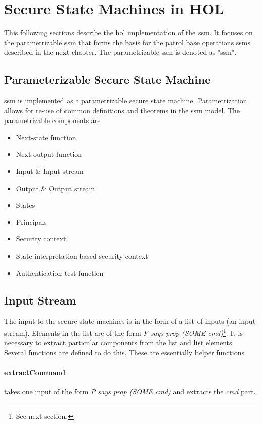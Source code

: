 \documentclass[../../main/main.tex]{subfiles}
\begin{document}
\section{Secure State Machines in HOL}\label{sec:sminHOL}
This following sections describe the \gls{hol} implementation of the \gls{ssm}.  It focuses on the parametrizable \gls{ssm} that forms the basis for the patrol base operations \glspl{ssm} described in the next chapter.  The parametrizable \gls{ssm} is denoted as "ssm".

\subsection{Parameterizable Secure State Machine}
ssm is implemented as a parametrizable secure state machine. Parametrization allows for re-use of common definitions and theorems in the \gls{ssm} model.  The parametrizable components are
\begin{itemize}
\item Next-state function
\item Next-output function
\item Input \& Input stream
\item Output \& Output stream
\item States
\item Principals
\item Security context
\item State interpretation-based security context
\item Authentication test function
\end{itemize}


\subsection{Input Stream}
The input to the secure state machines is in the form of a list of inputs (an input stream).  Elements in the list are of the form \textit{P says prop (SOME cmd)}\footnote{See next section.}.  It is necessary to extract particular components from the list and list elements.  Several functions are defined to do this.  These are essentially helper functions.

\paragraph*{extractCommand}
 takes one input of the form \textit{P says prop (SOME cmd)} and extracts the \textit{cmd} part.
\end{document}

